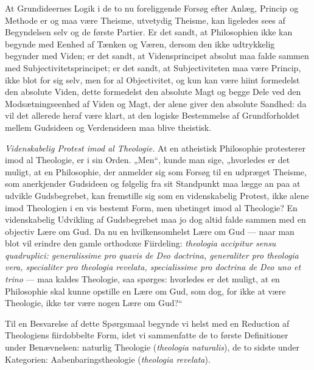 \documentclass[12pt]{book}
\newcommand{\opage}[1]{\marginnote{\footnotesize\textit{[#1]}}}
\begin{document}
At Grundideernes Logik i de to nu foreliggende Forsøg efter Anlæg, Princip og Methode er og maa være Theisme, utvetydig Theisme, kan ligeledes sees af Begyndelsen selv og de første Partier. Er det sandt, at Philosophien ikke kan begynde med Eenhed af Tænken og Væren, dersom den ikke udtrykkelig begynder med Viden; er det sandt, at Vidensprincipet absolut maa falde sammen med Subjectivitetsprincipet; er det sandt, at Subjectiviteten maa være Princip, ikke blot for sig selv, men for al Objectivitet, og kun kan være hiint formedelst den absolute Viden, dette formedelst den absolute Magt og begge Dele ved den Modsætningseenhed af Viden og Magt, der alene giver den absolute Sandhed: da vil det allerede heraf
\opage{X}være klart, at den logiske Bestemmelse af Grundforholdet mellem Gudsideen og Verdensideen maa blive theistisk.

\emph{Videnskabelig Protest imod al Theologie.} At en atheistisk Philosophie protesterer imod al Theologie, er i sin Orden. „Men“, kunde man sige, „hvorledes er det muligt, at en Philosophie, der anmelder sig som Forsøg til en udpræget Theisme, som anerkjender Gudsideen og følgelig fra sit Standpunkt maa lægge an paa at udvikle Gudsbegrebet, kan fremstille sig som en videnskabelig Protest, ikke alene imod Theologien i en vis bestemt Form, men ubetinget imod al Theologie? En videnskabelig Udvikling af Gudsbegrebet maa jo dog altid falde sammen med en objectiv Lære om Gud. Da nu en hvilkensomhelst Lære om Gud --- naar man blot vil erindre den gamle orthodoxe Fiirdeling: \textit{theologia accipitur sensu quadruplici: generalissime pro quavis de Deo doctrina, generaliter pro theologia vera, specialiter pro theologia revelata, specialissime pro doctrina de Deo uno et trino} --- maa kaldes Theologie, saa spørges: hvorledes er det muligt, at en Philosophie skal kunne opstille en Lære om Gud, som dog, for ikke at være Theologie, ikke tør være nogen Lære om Gud?“

Til en Besvarelse af dette Spørgsmaal begynde vi helst med en Reduction af Theologiens fiirdobbelte Form, idet vi sammenfatte de to første Definitioner under Benævnelsen: naturlig Theologie (\textit{theologia naturalis}), de to sidste under Kategorien: Aabenbaringstheologie (\textit{theologia revelata}).
\end{document}
